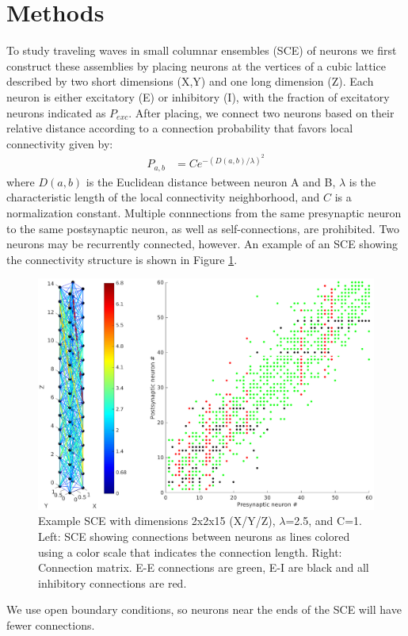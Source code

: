 \documentclass[12pt]{article}
\begin{document}
\section{Methods}
To study traveling waves in small columnar ensembles (SCE) of neurons we first construct these assemblies by placing neurons at the vertices of a cubic lattice described by two short dimensions (X,Y) and one long dimension (Z). 
Each neuron is either excitatory (E) or inhibitory (I), with the fraction of excitatory neurons indicated as $P_{exc}$.
After placing, we connect two neurons based on their relative distance according to a connection probability that favors local connectivity given by: 
\begin{align}\label{eq:connectivity}
 P_{a,b} &= C e^{-(D(a,b)/\lambda)^2}
\end{align}
where $D(a,b)$ is the Euclidean distance between neuron A and B, $\lambda$ is the characteristic length of the local connectivity neighborhood, and $C$ is a normalization constant.
Multiple connnections from the same presynaptic neuron to the same postsynaptic neuron, as well as self-connections, are prohibited.
Two neurons may be recurrently connected, however.
An example of an SCE showing the connectivity structure is shown in Figure \ref{fig:column_structure}.
\begin{figure}[!htb]
 \caption{Example SCE with dimensions 2x2x15 (X/Y/Z), $\lambda$=2.5, and C=1. Left: SCE showing connections between neurons as lines colored using a color scale that indicates the connection length. Right: Connection matrix. E-E connections are green, E-I are black and all inhibitory connections are red. }
 \label{fig:column_structure}
 \centering
   \includegraphics[width=\textwidth]{fig/column_structure}
\end{figure}
We use open boundary conditions, so neurons near the ends of the SCE will have fewer connections.
\end{document}
